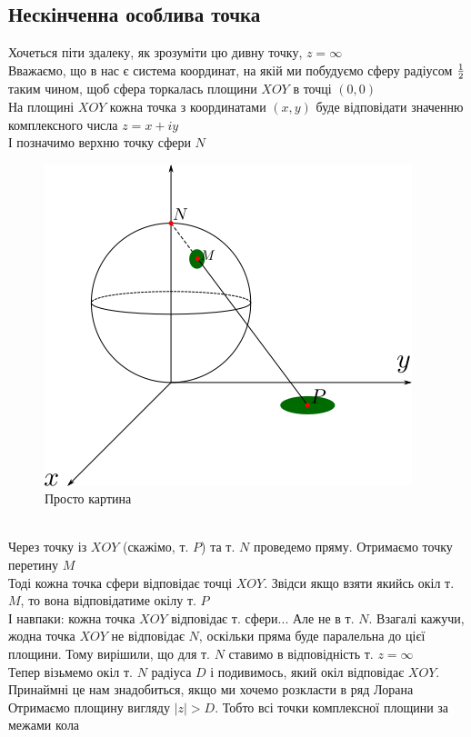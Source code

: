 \documentclass[a4paper, 14pt]{extarticle}
\begin{document}
\subsection{Нескінченна особлива точка}
Хочеться піти здалеку, як зрозуміти цю дивну точку, $z = \infty$\\
Вважаємо, що в нас є система координат, на якій ми побудуємо сферу радіусом $1\over{2}$ таким чином, щоб сфера торкалась площини $XOY$ в точці $(0,0)$\\
На площині $XOY$ кожна точка з координатами $(x,y)$ буде відповідати значенню комплексного числа $z = x + iy$\\
І позначимо верхню точку сфери $N$
\begin{figure}[h]
\centerline{\includegraphics[scale = 1]{Riemann_sphere.png}}
\caption{Просто картина}
\end{figure}
\\
Через точку із $XOY$ (скажімо, т. $P$) та т. $N$ проведемо пряму. Отримаємо точку перетину $M$\\
Тоді кожна точка сфери відповідає точці $XOY$. Звідси якщо взяти якийсь окіл т. $M$, то вона відповідатиме окілу т. $P$\\
І навпаки: кожна точка $XOY$ відповідає т. сфери... Але не в т. $N$. Взагалі кажучи, жодна точка $XOY$ не відповідає $N$, оскільки пряма буде паралельна до цієї площини. Тому вирішили, що для т. $N$ ставимо в відповідність т. $z = \infty$\\
Тепер візьмемо окіл т. $N$ радіуса $D$ і подивимось, який окіл відповідає $XOY$. Принаймні це нам знадобиться, якщо ми хочемо розкласти в ряд Лорана\\
Отримаємо площину вигляду $|z|>D$. Тобто всі точки комплексної площини за межами кола
\end{document}
